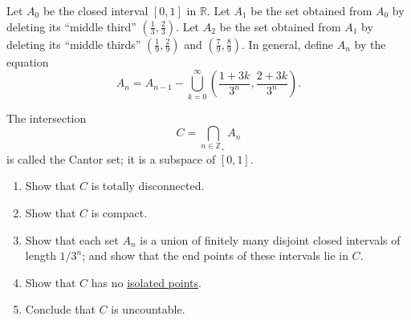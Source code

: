   \begin{exercise}[Munkres 27.6]
    Let $A_0$ be the closed interval $[0, 1]$ in $\mathbb{R}$. Let $A_1$ be the set obtained from $A_0$ by deleting its ``middle third'' $(\frac{1}{3}, \frac{2}{3})$. Let $A_2$ be the set obtained from $A_1$ by deleting its ``middle thirds'' $(\frac{1}{9}, \frac{2}{9})$ and $(\frac{7}{9}, \frac{8}{9})$. In general, define $A_n$ by the equation
    \begin{equation}
      A_n = A_{n-1} - \bigcup_{k=0}^{\infty}\left(\frac{1+3k}{3^n}, \frac{2+3k}{3^n}\right).
    \end{equation}
    
    The intersection
    \begin{equation}
      C = \bigcap_{n\in\mathbb{Z}_+} A_n
    \end{equation}
    is called the Cantor set; it is a subspace of $[0, 1]$.
    \begin{enumerate}
      \item[(a)] Show that $C$ is totally disconnected.
      \item[(b)] Show that $C$ is compact.
      \item[(c)] Show that each set $A_n$ is a union of finitely many disjoint closed intervals of length $1/3^n$; and show that the end points of these intervals lie in $C$.
      \item[(d)] Show that $C$ has no \hyperref[def:isolated-point]{isolated points}.
      \item[(e)] Conclude that $C$ is uncountable.
    \end{enumerate}
  \end{exercise}
